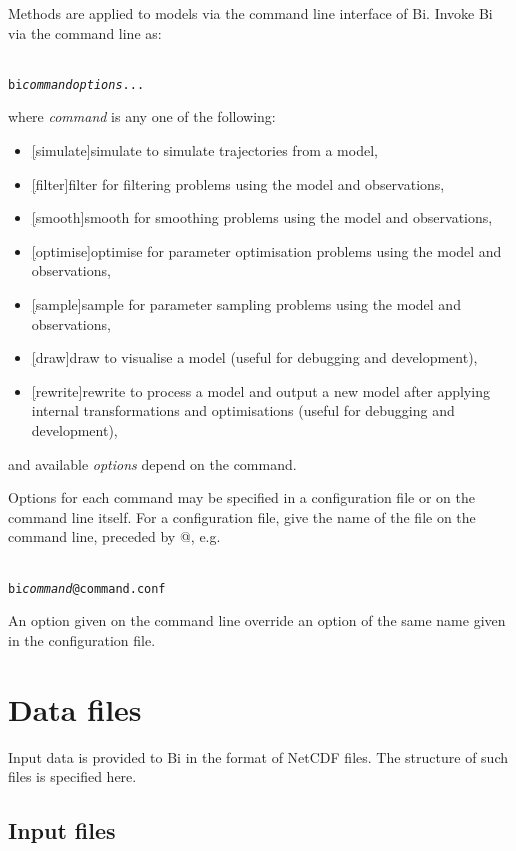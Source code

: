 Methods are applied to models via the command line interface of Bi. Invoke Bi
via the command line as:
\begin{alltt}{\sf
    bi \textit{command} \textit{options} ...
}\end{alltt}
where \textsf{\textit{command}} is any one of the following:
\begin{itemize}
\item \textsf{\hyperref[hyper][simulate]{simulate}} to simulate trajectories
  from a model,
\item \textsf{\hyperref[hyper][filter]{filter}} for filtering problems using the
  model and observations,
\item \textsf{\hyperref[hyper][smooth]{smooth}} for smoothing problems using the
  model and observations,
\item \textsf{\hyperref[hyper][optimise]{optimise}} for parameter optimisation
  problems using the model and observations,
\item \textsf{\hyperref[hyper][sample]{sample}} for parameter sampling
  problems using the model and observations,
\item \textsf{\hyperref[hyper][draw]{draw}} to visualise a model (useful for
  debugging and development),
\item \textsf{\hyperref[hyper][rewrite]{rewrite}} to process a model and
  output a new model after applying internal transformations and optimisations
  (useful for debugging and development),
\end{itemize}
and available \textsf{\textit{options}} depend on the command.

Options for each command may be specified in a configuration file or on the command line itself. For a configuration file, give the name
of the file on the command line, preceded by \textsf{@}, e.g.
\begin{alltt}{\sf
    bi \textit{command} @command.conf
}\end{alltt}
An option given on the command line override an option of the same name given
in the configuration file.

\section{Data files\label{Data_files}}

Input data is provided to Bi in the format of NetCDF files. The
structure of such files is specified here.

\subsection{Input files}

